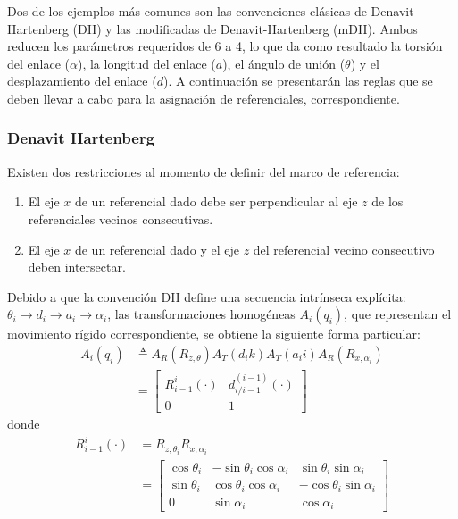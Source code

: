 \documentclass[journal]{IEEEtran}
\begin{document}
    \noindent Dos de los ejemplos más comunes son las convenciones clásicas de Denavit-Hartenberg (DH) y las modificadas de
    Denavit-Hartenberg (mDH). Ambos reducen los parámetros requeridos de 6 a 4, lo que da como resultado la torsión del enlace
    ($\alpha$), la longitud del enlace ($a$), el ángulo de unión ($\theta$) y el desplazamiento del enlace ($d$).
    \noindent A continuación se presentarán las reglas que se deben llevar a cabo para la asignación de referenciales,
    correspondiente.

    \subsubsection{Denavit Hartenberg}
    \noindent Existen dos restricciones al momento de definir del marco de referencia: 
    \begin{enumerate}
        \item El eje $x$ de un referencial dado debe ser perpendicular al eje $z$ de los referenciales vecinos consecutivas. 
        \item El eje $x$ de un referencial dado y el eje $z$ del referencial vecino consecutivo deben intersectar. 
    \end{enumerate}

    \noindent Debido a que la convención DH define una secuencia intrínseca explícita:
    $\theta_i \rightarrow d_i \rightarrow a_i \rightarrow \alpha_i$, las transformaciones homogéneas $A_i (q_i)$,
    que representan el movimiento rígido correspondiente, se obtiene la siguiente forma particular:
    \begin{align*}
        A_i (q_i) & \triangleq A_R (R_{z,\theta}) A_T (d_i k) A_T (a_i i) A_R (R_{x,\alpha_i}) \\
        & = \left[  \begin{array}{cc}
            R_{i-1}^i (\cdot)  & d_{i/i-1}^{(i-1)} (\cdot) \\
            0 & 1  
    \end{array} \right]
    \end{align*}
    donde
    \begin{align*}
        R_{i-1}^i (\cdot) & = R_{z,\theta_i}  R_{x,\alpha_i} \\ 
        & = \left[  \begin{array}{ccc}
            \cos{\theta_i}  & -\sin{\theta_i}\cos{\alpha_i} & \sin{\theta_i} \sin{\alpha_i} \\
            \sin{\theta_i} &  \cos{\theta_i}\cos{\alpha_i} &
            -\cos{\theta_i}\sin{\alpha_i} \\
            0 & \sin{\alpha_i} & \cos{\alpha_i}
        \end{array} \right]
    \end{align*}
\end{document}
